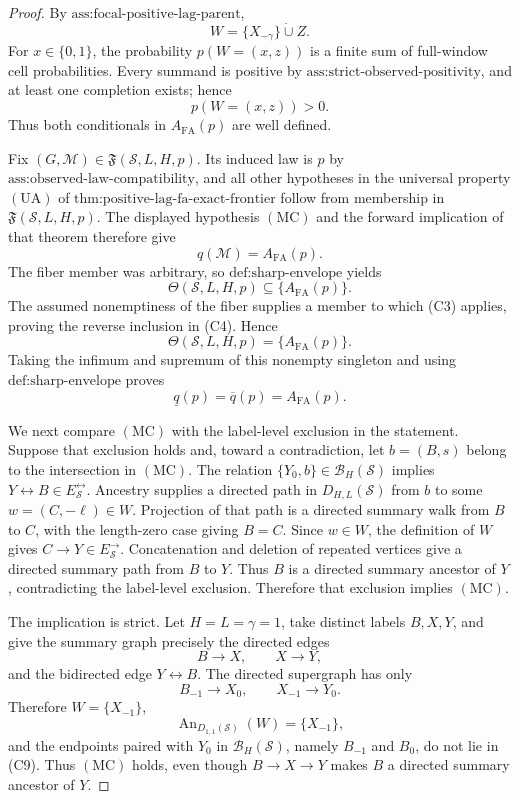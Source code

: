 \documentclass{article}
\begin{document}
\begin{proof}
By \(\text{ass:focal-positive-lag-parent}\),
\[
W=\{X_{-\gamma}\}\mathbin{\dot\cup}Z.
\tag{C1}
\]
For \(x\in\{0,1\}\), the probability \(p(W=(x,z))\) is a finite sum of full-window cell probabilities.  Every summand is positive by \(\text{ass:strict-observed-positivity}\), and at least one completion exists; hence
\[
p(W=(x,z))>0.
\tag{C2}
\]
Thus both conditionals in \(A_{\mathrm{FA}}(p)\) are well defined.

Fix \((G,\mathcal M)\in\mathfrak F(\mathcal S,L,H,p)\).  Its induced law is \(p\) by \(\text{ass:observed-law-compatibility}\), and all other hypotheses in the universal property \(\mathrm{(UA)}\) of \(\text{thm:positive-lag-fa-exact-frontier}\) follow from membership in \(\mathfrak F(\mathcal S,L,H,p)\).  The displayed hypothesis \(\mathrm{(MC)}\) and the forward implication of that theorem therefore give
\[
q(\mathcal M)=A_{\mathrm{FA}}(p).
\tag{C3}
\]
The fiber member was arbitrary, so \(\text{def:sharp-envelope}\) yields
\[
\Theta(\mathcal S,L,H,p)\subseteq\{A_{\mathrm{FA}}(p)\}.
\tag{C4}
\]
The assumed nonemptiness of the fiber supplies a member to which (C3) applies, proving the reverse inclusion in (C4).  Hence
\[
\Theta(\mathcal S,L,H,p)=\{A_{\mathrm{FA}}(p)\}.
\tag{C5}
\]
Taking the infimum and supremum of this nonempty singleton and using \(\text{def:sharp-envelope}\) proves
\[
\underline q(p)=\overline q(p)=A_{\mathrm{FA}}(p).
\tag{C6}
\]

We next compare \(\mathrm{(MC)}\) with the label-level exclusion in the statement.  Suppose that exclusion holds and, toward a contradiction, let \(b=(B,s)\) belong to the intersection in \(\mathrm{(MC)}\).  The relation \(\{Y_0,b\}\in\mathcal B_H(\mathcal S)\) implies \(Y\leftrightarrow B\in E_{\mathcal S}^{\leftrightarrow}\).  Ancestry supplies a directed path in \(D_{H,L}(\mathcal S)\) from \(b\) to some \(w=(C,-\ell)\in W\).  Projection of that path is a directed summary walk from \(B\) to \(C\), with the length-zero case giving \(B=C\).  Since \(w\in W\), the definition of \(W\) gives \(C\to Y\in E_{\mathcal S}^{\to}\).  Concatenation and deletion of repeated vertices give a directed summary path from \(B\) to \(Y\).  Thus \(B\) is a directed summary ancestor of \(Y\), contradicting the label-level exclusion.  Therefore that exclusion implies \(\mathrm{(MC)}\).

The implication is strict.  Let \(H=L=\gamma=1\), take distinct labels \(B,X,Y\), and give the summary graph precisely the directed edges
\[
B\to X,
\qquad
X\to Y,
\tag{C7}
\]
and the bidirected edge \(Y\leftrightarrow B\).  The directed supergraph has only
\[
B_{-1}\to X_0,
\qquad
X_{-1}\to Y_0.
\tag{C8}
\]
Therefore \(W=\{X_{-1}\}\),
\[
\operatorname{An}_{D_{1,1}(\mathcal S)}(W)=\{X_{-1}\},
\tag{C9}
\]
and the endpoints paired with \(Y_0\) in \(\mathcal B_H(\mathcal S)\), namely \(B_{-1}\) and \(B_0\), do not lie in (C9).  Thus \(\mathrm{(MC)}\) holds, even though \(B\to X\to Y\) makes \(B\) a directed summary ancestor of \(Y\).


\end{proof}
\end{document}
